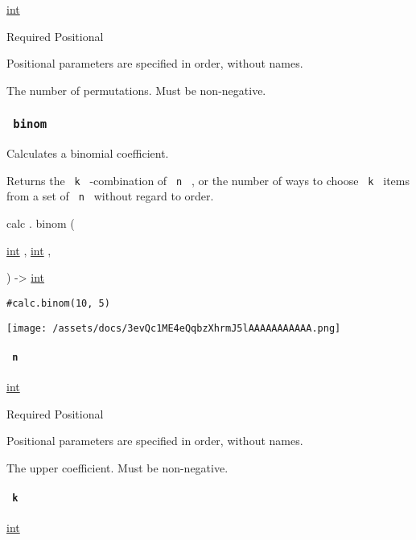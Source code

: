 \href{/docs/reference/foundations/int/}{int}

{Required} {{ Positional }}

\label{functions-perm-numbers-positional-tooltip}
Positional parameters are specified in order, without names.

The number of permutations. Must be non-negative.

\subsubsection{\texorpdfstring{\texttt{\ binom\ }}{ binom }}\label{functions-binom}

Calculates a binomial coefficient.

Returns the \texttt{\ k\ } -combination of \texttt{\ n\ } , or the
number of ways to choose \texttt{\ k\ } items from a set of
\texttt{\ n\ } without regard to order.

calc { . } { binom } (

{ \href{/docs/reference/foundations/int/}{int} , } {
\href{/docs/reference/foundations/int/}{int} , }

) -\textgreater{} \href{/docs/reference/foundations/int/}{int}

\begin{verbatim}
#calc.binom(10, 5)
\end{verbatim}

\texttt{[image: /assets/docs/3evQc1ME4eQqbzXhrmJ5lAAAAAAAAAAA.png]}

\paragraph{\texorpdfstring{\texttt{\ n\ }}{ n }}\label{functions-binom-n}

\href{/docs/reference/foundations/int/}{int}

{Required} {{ Positional }}

\label{functions-binom-n-positional-tooltip}
Positional parameters are specified in order, without names.

The upper coefficient. Must be non-negative.

\paragraph{\texorpdfstring{\texttt{\ k\ }}{ k }}\label{functions-binom-k}

\href{/docs/reference/foundations/int/}{int}

